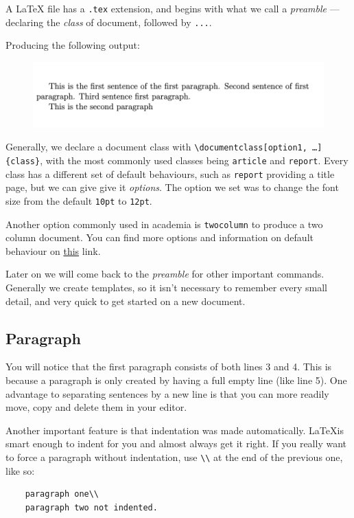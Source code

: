 A LaTeX file has a \verb|.tex| extension, and begins with what we call a \emph{preamble} --- declaring the \emph{class} of document, followed by \verb|...|.


Producing the following output:

\begin{figure}[h]
    \centering
    \includegraphics[width=\textwidth]{figures/chapters.png}
    \label{fig:chapters}
\end{figure}

Generally, we declare a document class with \texttt{\textbackslash documentclass[option1, \ldots]\{class\}}, with the most commonly used classes being \verb|article| and \verb|report|.
Every class has a different set of default behaviours, such as \verb|report| providing a title page, but we can give give it \emph{options}.
The option we set was to change the font size from the default \verb|10pt| to \verb|12pt|.

Another option commonly used in academia is \verb|twocolumn| to produce a two column document.
You can find more options and information on default behaviour on \href{https://texblog.org/2013/02/13/latex-documentclass-options-illustrated/}{this} link.

Later on we will come back to the \emph{preamble} for other important commands.
Generally we create templates, so it isn't necessary to remember every small detail, and very quick to get started on a new document.

\subsection{Paragraph}

You will notice that the first paragraph consists of both lines 3 and 4.
This is because a paragraph is only created by having a full empty line (like line 5).
One advantage to separating sentences by a new line is that you can more readily move, copy and delete them in your editor.

Another important feature is that indentation was made automatically.
\LaTeX is smart enough to indent for you and almost always get it right.
If you really want to force a paragraph without indentation, use \verb|\\| at the end of the previous one, like so:
\begin{lstlisting}
    paragraph one\\
    paragraph two not indented.
\end{lstlisting}
